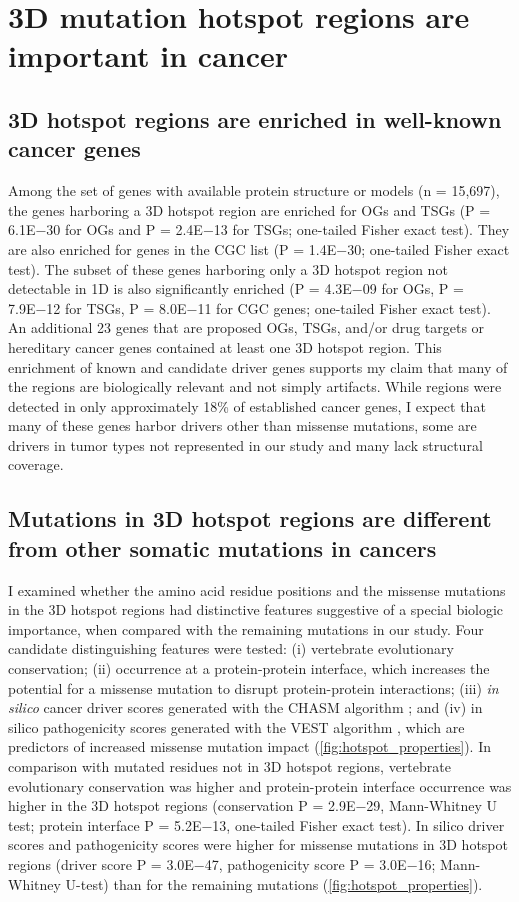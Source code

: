 \section{3D mutation hotspot regions are important in cancer}

\subsection{3D hotspot regions are enriched in well-known cancer genes}

Among the set of genes with available protein structure or models (n = 15,697), the genes harboring a 3D hotspot region are enriched for OGs and TSGs (P = 6.1E−30 for OGs and P = 2.4E−13 for TSGs; one-tailed Fisher exact test). They are also enriched for genes in the CGC list (P = 1.4E−30; one-tailed Fisher exact test). The subset of these genes harboring only a 3D hotspot region not detectable in 1D is also significantly enriched (P = 4.3E−09 for OGs, P = 7.9E−12 for TSGs, P = 8.0E−11 for CGC genes; one-tailed Fisher exact test). An additional 23 genes that are proposed OGs, TSGs, and/or drug targets or hereditary cancer genes contained at least one 3D hotspot region. This enrichment of known and candidate driver genes supports my claim that many of the regions are biologically relevant and not simply artifacts. While regions were detected in only approximately 18\% of established cancer genes, I expect that many of these genes harbor drivers other than missense mutations, some are drivers in tumor types not represented in our study and many lack structural coverage.

\subsection{Mutations in 3D hotspot regions are different from other somatic mutations in cancers}

I examined whether the amino acid residue positions and the missense mutations in the 3D hotspot regions had distinctive features suggestive of a special biologic importance, when compared with the remaining mutations in our study. Four candidate distinguishing features were tested: (i) vertebrate evolutionary conservation; (ii) occurrence at a protein-protein interface, which increases the potential for a missense mutation to disrupt protein-protein interactions; (iii) \textit{in silico} cancer driver scores generated with the CHASM algorithm \cite{RN29}; and (iv) in silico pathogenicity scores generated with the VEST algorithm \cite{RN30}, which are predictors of increased missense mutation impact (\autoref{fig:hotspot_properties}). In comparison with mutated residues not in 3D hotspot regions, vertebrate evolutionary conservation was higher and protein-protein interface occurrence was higher in the 3D hotspot regions (conservation P = 2.9E−29, Mann-Whitney U test; protein interface P = 5.2E−13, one-tailed Fisher exact test). In silico driver scores and pathogenicity scores were higher for missense mutations in 3D hotspot regions (driver score P = 3.0E−47, pathogenicity score P = 3.0E−16; Mann-Whitney U-test) than for the remaining mutations (\autoref{fig:hotspot_properties}).

